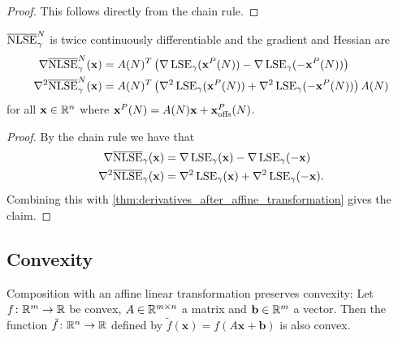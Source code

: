 \begin{proof}
 This follows directly from the chain rule.
\end{proof}


\begin{corollary} \label{thm:NLSE_derivatives}
 \(\overline{\operatorname{NLSE}}_\gamma^N\) is twice continuously differentiable and the gradient and Hessian are
 \begin{align*}
  \nabla \overline{\operatorname{NLSE}}_\gamma^N (\mathbf{x})   &= A(N)^T \left({\nabla \operatorname{LSE}_{\gamma}(\mathbf{x}^P(N)) - \nabla \operatorname{LSE}_{\gamma}(-\mathbf{x}^P(N))}\right) \\
  \nabla^2 \overline{\operatorname{NLSE}}_\gamma^N (\mathbf{x}) &= A(N)^T \left({\nabla^2 \operatorname{LSE}_{\gamma}(\mathbf{x}^P(N)) + \nabla^2 \operatorname{LSE}_{\gamma}(-\mathbf{x}^P(N))}\right) A(N)
 \end{align*}
 for all \(\mathbf{x} \in \mathbb{R}^n\) where \( \mathbf{x}^P(N) = A(N) \mathbf{x} + \mathbf{x}_{\operatorname{offs}}^P(N) \).
\end{corollary}

\begin{proof}
 By the chain rule we have that
 \begin{align*}
  \nabla \overline{\operatorname{NLSE}}_\gamma (\mathbf{x})   &= \nabla \operatorname{LSE}_{\gamma}(\mathbf{x}) - \nabla \operatorname{LSE}_{\gamma}(-\mathbf{x}) \\
  \nabla^2 \overline{\operatorname{NLSE}}_\gamma (\mathbf{x}) &= \nabla^2 \operatorname{LSE}_{\gamma}(\mathbf{x}) + \nabla^2 \operatorname{LSE}_{\gamma}(-\mathbf{x}).
 \end{align*}
 Combining this with \cref{thm:derivatives_after_affine_transformation} gives the claim.
\end{proof}



\subsection{Convexity} \label{sec:NLSE_convexity}

\begin{lemma} \label{thm:affine_transformation_preserves_convexity}
 Composition with an affine linear transformation preserves convexity:
 Let \(f \colon \mathbb{R}^m \to \mathbb{R}\) be convex, \(A \in \mathbb{R}^{m \times n}\) a matrix and \(\mathbf{b} \in \mathbb{R}^m\) a vector.
 Then the function \(\tilde{f} \colon \mathbb{R}^n \to \mathbb{R}\) defined by
 \( \tilde{f}(\mathbf{x}) = f(A\mathbf{x} + \mathbf{b}) \)
 is also convex.
\end{lemma}

